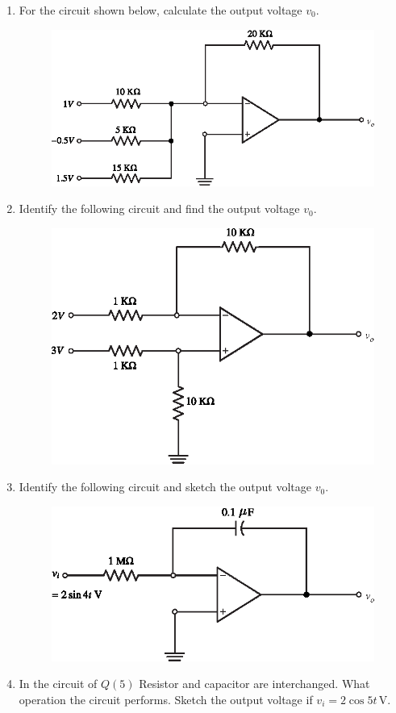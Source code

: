 \begin{enumerate}
\smallskip
\item For the circuit shown below, calculate the output voltage $v_{0}$.
\smallskip
\begin{figure}[H]
\centering
\includegraphics[scale=.9]{addfig/exr5.3.eps}
\end{figure}

\eject

\item Identify the following circuit and find the output voltage $v_{0}$.
\begin{figure}[H]
\centering
\includegraphics[scale=.9]{addfig/exr5.4.eps}
\end{figure}

\item Identify the following circuit and sketch the output voltage $v_{0}$.
\begin{figure}[H]
\centering
\includegraphics[scale=.9]{addfig/exr5.5.eps}
\end{figure}

\item In the circuit of $Q(5)$ Resistor and capacitor are interchanged. What operation the circuit performs. Sketch the output voltage if $v_{i}=2\cos 5t$\,V.
\end{enumerate}
